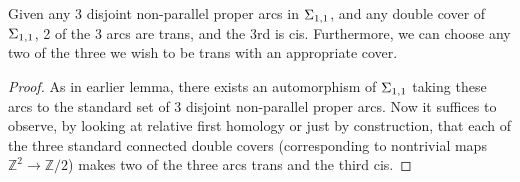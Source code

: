 \begin{lemma}

Given any 3 disjoint non-parallel proper arcs in $\Sigma_{1,1}$, and any double
cover of $\Sigma_{1,1}$, 2 of the 3 arcs are trans, and the 3rd is cis.
Furthermore, we can choose any two of the three we wish to be trans with an
appropriate cover.

\end{lemma}
\begin{proof}

As in earlier lemma, there exists an automorphism of $\Sigma_{1,1}$ taking these
arcs to the standard set of 3 disjoint non-parallel proper arcs.  Now it
suffices to observe, by looking at relative first homology or just by
construction, that each of the three standard connected double covers
(corresponding to nontrivial maps $\mathbb{Z}^2 \to \mathbb{Z}/2$) makes two of
the three arcs trans and the third cis.

\end{proof}

